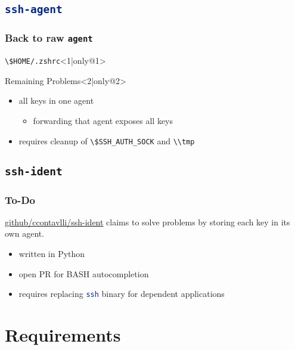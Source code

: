\documentclass[]{beamer}
\renewcommand{\sh}[1]{\lstinline[columns=fixed,language=sh]{#1}}
\begin{document}
\subsection{\sh{ssh-agent}}
\begin{frame}
  \frametitle{Back to raw \sh{agent}}
  \begin{block}{\sh{\$HOME/.zshrc}}<1|only@1>
    \fontsize{8}{0}
    \selectfont{}
    
  \end{block}
  \begin{block}{Remaining Problems}<2|only@2>
    \begin{itemize}
    \item
      all keys in one agent
      \begin{itemize}
      \item
        forwarding that agent exposes all keys
      \end{itemize}
    \item
      requires cleanup of \sh{\$SSH_AUTH_SOCK} and \sh{\\tmp}
    \end{itemize}
  \end{block}
\end{frame}

\subsection{\sh{ssh-ident}}
\begin{frame}
  \frametitle{To-Do}
  \href{https://github.com/ccontavalli/ssh-ident}{github/ccontavlli/ssh-ident} claims to solve problems by storing each key in its own agent.
  \begin{itemize}
  \item
    written in Python
  \item
    open PR for BASH autocompletion
  \item
    requires replacing \sh{ssh} binary for dependent applications
  \end{itemize}
\end{frame}

\section{Requirements}
\end{document}
